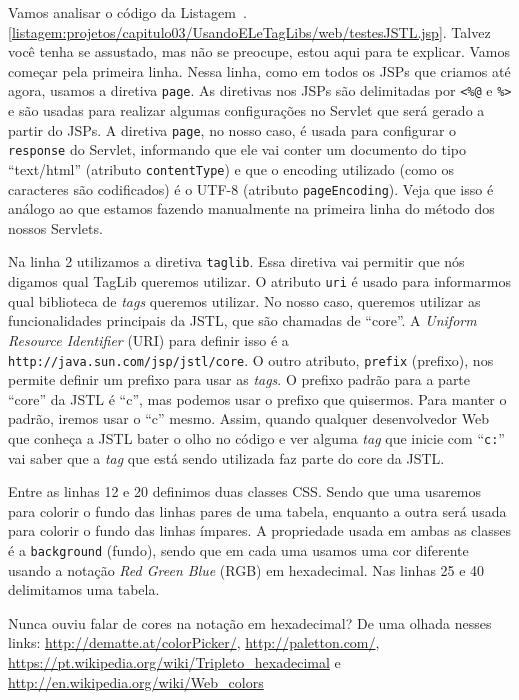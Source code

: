 Vamos analisar o código da Listagem~\thechapter.\ref{listagem:projetos/capitulo03/UsandoELeTagLibs/web/testesJSTL.jsp}. Talvez você tenha se assustado, mas não se preocupe, estou aqui para te explicar. Vamos começar pela primeira linha. Nessa linha, como em todos os JSPs que criamos até agora, usamos a diretiva \texttt{page}. As diretivas nos JSPs são delimitadas por \texttt{<\%@} e \texttt{\%>} e são usadas para realizar algumas configurações no Servlet que será gerado a partir do JSPs. A diretiva \texttt{page}, no nosso caso, é usada para configurar o \texttt{response} do Servlet, informando que ele vai conter um documento do tipo ``text/html'' (atributo \texttt{contentType}) e que o encoding utilizado (como os caracteres são codificados) é o UTF-8 (atributo \texttt{pageEncoding}). Veja que isso é análogo ao que estamos fazendo manualmente na primeira linha do método  dos nossos Servlets.

Na linha 2 utilizamos a diretiva \texttt{taglib}. Essa diretiva vai permitir que nós digamos qual TagLib queremos utilizar. O atributo \texttt{uri} é usado para informarmos qual biblioteca de \textit{tags} queremos utilizar. No nosso caso, queremos utilizar as funcionalidades principais da JSTL, que são chamadas de ``core''. A \textit{Uniform Resource Identifier} (URI) para definir isso é a \texttt{http://java.sun.com/jsp/jstl/core}. O outro atributo, \texttt{prefix} (prefixo), nos permite definir um prefixo para usar as \textit{tags}. O prefixo padrão para a parte ``core'' da JSTL é ``c'', mas podemos usar o prefixo que quisermos. Para manter o padrão, iremos usar o ``c'' mesmo. Assim, quando qualquer desenvolvedor Web que conheça a JSTL bater o olho no código e ver alguma \textit{tag} que inicie com ``\texttt{c:}'' vai saber que a \textit{tag} que está sendo utilizada faz parte do core da JSTL.

Entre as linhas 12 e 20 definimos duas classes CSS. Sendo que uma usaremos para colorir o fundo das linhas pares de uma tabela, enquanto a outra será usada para colorir o fundo das linhas ímpares. A propriedade usada em ambas as classes é a \texttt{background} (fundo), sendo que em cada uma usamos uma cor diferente usando a notação \textit{Red Green Blue} (RGB) em hexadecimal. Nas linhas 25 e 40 delimitamos uma tabela.

\begin{saibaMais}
    Nunca ouviu falar de cores na notação em hexadecimal? De uma olhada nesses links: \url{http://dematte.at/colorPicker/}, \url{http://paletton.com/}, \url{https://pt.wikipedia.org/wiki/Tripleto_hexadecimal} e \url{http://en.wikipedia.org/wiki/Web_colors}
\end{saibaMais}

